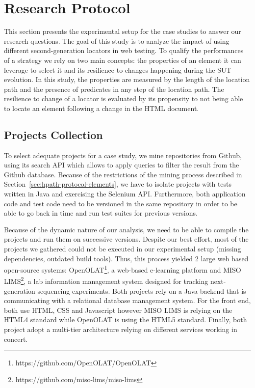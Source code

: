 \section{Research Protocol}
\label{sec:hpath-protocol}

This section presents the experimental setup for the case studies to answer our research questions. The goal of this study is to analyze the impact of using different second-generation locators in web testing. To qualify the performances of a strategy we rely on two main concepts: the properties of an element it can leverage to select it and its resilience to changes happening during the SUT evolution. In this study, the properties are measured by the length of the location path and the presence of predicates in any step of the location path. The resilience to change of a locator is evaluated by its propensity to not being able to locate an element following a change in the HTML document.

\subsection{Projects Collection}
\label{sec:hpath-protocol-projects}

To select adequate projects for a case study, we mine repositories from Github, using its search API which allows to apply queries to filter the result from the Github database. Because of the restrictions of the mining process described in Section~\ref{sec:hpath-protocol-elements}, we have to isolate projects with tests written in Java and exercising the Selenium API. Furthermore, both application code and test code need to be versioned in the same repository in order to be able to go back in time and run test suites for previous versions.

Because of the dynamic nature of our analysis, we need to be able to compile the projects and run them on successive versions. Despite our best effort, most of the projects we gathered could not be executed in our experimental setup (missing dependencies, outdated build tools). Thus, this process yielded 2 large web based open-source systems: OpenOLAT\footnote{https://github.com/OpenOLAT/OpenOLAT}, a web-based e-learning platform and MISO LIMS\footnote{https://github.com/miso-lims/miso-lims}, a lab information management system designed for tracking next-generation sequencing experiments. Both projects rely on a Java backend that is communicating with a relational database management system. For the front end, both use HTML, CSS and Javascript however MISO LIMS is relying on the HTML4 standard while OpenOLAT is using the HTML5 standard. Finally, both project adopt a multi-tier architecture relying on different services working in concert.

